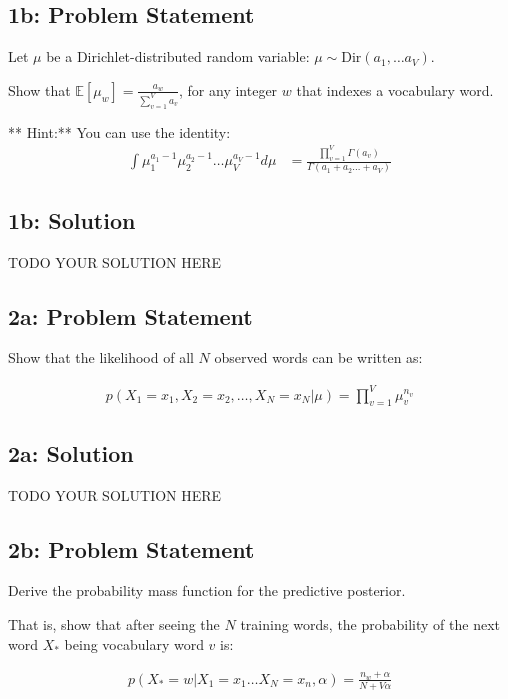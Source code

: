 \documentclass[12pt]{article}
\newcommand{\officialdirections}[1]{{\color{blue} #1}}
\begin{document}
\newpage
\officialdirections{
\subsection*{1b: Problem Statement}

Let $\mu$ be a Dirichlet-distributed random variable: $\mu \sim \text{Dir}(a_1, \ldots a_V)$. 

Show that $\mathbb{E}[ \mu_w ] = \frac{a_w}{\sum_{v=1}^V a_v}$, for any integer $w$ that indexes a vocabulary word.

** Hint:** You can use the identity:
\begin{align}
\int \mu_1^{a_1-1} \mu_2^{a_2 - 1} \ldots \mu_V^{a_V-1} d\mu
 &= \frac
 	{\prod_{v=1}^V \Gamma(a_v)}
 	{\Gamma(a_1 + a_2 \ldots + a_V)}
\end{align}
}

\subsection{1b: Solution}
TODO YOUR SOLUTION HERE

\newpage
\officialdirections{
\subsection*{2a: Problem Statement}

Show that the likelihood of all $N$ observed words can be written as:

\begin{align}
p(X_1 = x_1, X_2 = x_2, \ldots, X_N = x_N | \mu) = \prod_{v=1}^V \mu_v^{n_v}
\end{align}
}

\subsection{2a: Solution}


TODO YOUR SOLUTION HERE


\newpage
\officialdirections{
\subsection*{2b: Problem Statement}

Derive the probability mass function for the predictive posterior.

That is, show that after seeing the $N$ training words, the probability of the next word $X_*$ being vocabulary word $v$ is:

\begin{align}
p( X_* = w | X_1 = x_1 \ldots X_N = x_n, \alpha) = \frac{n_w + \alpha}{N + V\alpha}
\end{align}
}
\end{document}
